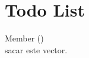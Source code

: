 \chapter{Todo List}
\hypertarget{todo}{}\label{todo}

\begin{DoxyRefList}
\item[Member \doxylink{class_ragot_1_1_scene_a7a1dcaed66fa5eb3af89519a7f4f9c8f}{Ragot\+::Scene\+::collect\+\_\+components} ()]\hfill \\
\label{todo__todo000001}%
%
sacar este vector. 
\end{DoxyRefList}